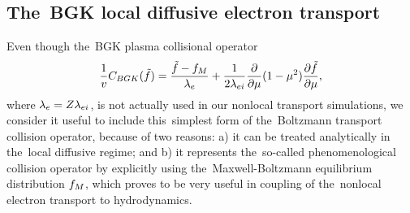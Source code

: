\subsection{The~BGK local diffusive electron transport}
\label{sec:BGKDiffusiveRegime}

Even though the~BGK plasma collisional operator \cite{BGK_1954}
\begin{equation}
  \frac{1}{v}C_{BGK}(\tilde{f})
  =
  \frac{\tilde{f} - f_M}{\lambda_e}
  + \frac{1}{2 \lambda_{ei}}
  \frac{\partial{}}{\partial{\mu}}(1 - \mu^2)\frac{\partial{\tilde{f}}}{\partial{\mu}} ,
  \label{app_eq:BGK_model_1D}
\end{equation}
where $\lambda_e = Z \lambda_{ei}$, 
is not actually used in our nonlocal transport simulations, we consider it 
useful to include this~simplest form of the~Boltzmann transport collision 
operator, because of two reasons: a) it can be treated analytically in 
the~local diffusive regime; and b) it represents the~so-called phenomenological
collision operator by explicitly using the~Maxwell-Boltzmann equilibrium 
distribution $f_M$, which proves to be very useful in coupling of the~nonlocal 
electron transport to hydrodynamics.

